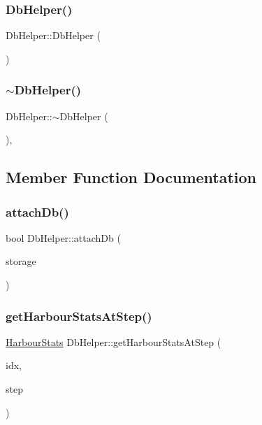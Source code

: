 \subsubsection{\texorpdfstring{DbHelper()}{DbHelper()}}
{\footnotesize\ttfamily Db\+Helper\+::\+Db\+Helper (\begin{DoxyParamCaption}{ }\end{DoxyParamCaption})}

\mbox{\label{class_db_helper_a1602442e5c1c0a55c5733ac52253fc05}} 
\subsubsection{\texorpdfstring{$\sim$DbHelper()}{~DbHelper()}}
{\footnotesize\ttfamily Db\+Helper\+::$\sim$\+Db\+Helper (\begin{DoxyParamCaption}{ }\end{DoxyParamCaption})\hspace{0.3cm}{\ttfamily [default]}, {\ttfamily [noexcept]}}



\subsection{Member Function Documentation}
\mbox{\label{class_db_helper_a908260fddcd1fec10e10bdb551a710f8}} 
\subsubsection{\texorpdfstring{attachDb()}{attachDb()}}
{\footnotesize\ttfamily bool Db\+Helper\+::attach\+Db (\begin{DoxyParamCaption}\item[{std\+::shared\+\_\+ptr$<$ \mbox{\hyperlink{class_s_q_lite_output_storage}{S\+Q\+Lite\+Output\+Storage}} $>$}]{storage }\end{DoxyParamCaption})}

\mbox{\label{class_db_helper_a89a83b296e55826579decec1d9cbb260}} 
\subsubsection{\texorpdfstring{getHarbourStatsAtStep()}{getHarbourStatsAtStep()}}
{\footnotesize\ttfamily \mbox{\hyperlink{class_harbour_stats}{Harbour\+Stats}} Db\+Helper\+::get\+Harbour\+Stats\+At\+Step (\begin{DoxyParamCaption}\item[{int}]{idx,  }\item[{int}]{step }\end{DoxyParamCaption})}

